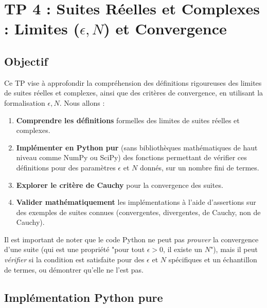 \documentclass[a4paper,11pt]{report}
\begin{document}
\section*{TP 4 : Suites Réelles et Complexes : Limites ($\epsilon, N$) et Convergence}

\subsection*{Objectif}
Ce TP vise à approfondir la compréhension des définitions rigoureuses des limites de suites réelles et complexes, ainsi que des critères de convergence, en utilisant la formalisation $\epsilon, N$. Nous allons :
\begin{enumerate}
\item \textbf{Comprendre les définitions} formelles des limites de suites réelles et complexes.

\item \textbf{Implémenter en Python pur} (sans bibliothèques mathématiques de haut niveau comme NumPy ou SciPy) des fonctions permettant de vérifier ces définitions pour des paramètres $\epsilon$ et $N$ donnés, sur un nombre fini de termes.

\item \textbf{Explorer le critère de Cauchy} pour la convergence des suites.

\item \textbf{Valider mathématiquement} les implémentations à l'aide d'assertions sur des exemples de suites connues (convergentes, divergentes, de Cauchy, non de Cauchy).
\end{enumerate}

Il est important de noter que le code Python ne peut pas \textit{prouver} la convergence d'une suite (qui est une propriété "pour tout $\epsilon > 0$, il existe un $N$"), mais il peut \textit{vérifier} si la condition est satisfaite pour des $\epsilon$ et $N$ spécifiques et un échantillon de termes, ou démontrer qu'elle ne l'est pas.

\subsection*{Implémentation Python pure}
\end{document}
